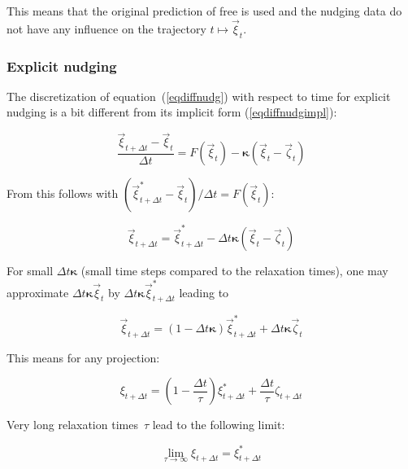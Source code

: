 This means that the original prediction of free \echam{} is used
and the nudging 
data do not have any influence on the trajectory $t\mapsto\vec{\xi}_t$.

\subsubsection{Explicit nudging}\label{secnudgexpl}

The discretization of equation~(\ref{eqdiffnudg}) with respect to time
for explicit nudging is a bit different from its implicit form
(\ref{eqdiffnudgimpl}): 

\begin{equation}\label{eqdiffnudgexpl}
\frac{\vec{\xi}_{t+\Delta t}-\vec{\xi}_{t}}{\Delta t}
= F(\vec{\xi}_t)-\boldsymbol{\kappa}(\vec{\xi}_{t}-\vec{\zeta}_{t})
\end{equation}

From this follows with $(\vec{\xi}^\ast_{t+\Delta
  t}-\vec{\xi}_t)/\Delta t = F(\vec{\xi}_t)$:

\begin{displaymath}
\vec{\xi}_{t+\Delta t}=\vec{\xi}^\ast_{t+\Delta t}-\Delta t
\boldsymbol{\kappa} \left(\vec{\xi}_t-\vec{\zeta}_t\right)
\end{displaymath}

For small $\Delta t \boldsymbol{\kappa}$ (small time steps compared to
the relaxation times), one may approximate $\Delta t
\boldsymbol{\kappa}\vec{\xi}_t$ by $\Delta
t\boldsymbol{\kappa}\vec{\xi}^\ast_{t+\Delta t}$ leading to 

\begin{equation}
\vec{\xi}_{t+\Delta t}=(1-\Delta t
\boldsymbol{\kappa})\vec{\xi}^\ast_{t+\Delta t}+\Delta
t\boldsymbol{\kappa}\vec{\zeta}_t 
\end{equation}

This means for any projection:

\begin{equation}\label{eqnumnexpl}
\xi_{t+\Delta t}=\left(1-\frac{\Delta
    t}{\tau}\right)\xi^\ast_{t+\Delta t} + \frac{\Delta t}{\tau}\zeta_{t+\Delta t}
\end{equation}

Very long relaxation times~$\tau$ lead to the following
limit:

\begin{equation}\label{eqlimittauinfexpl}
\lim\limits_{\tau\rightarrow\infty}\xi_{t+\Delta t}=\xi^\ast_{t+\Delta t}
\end{equation}

